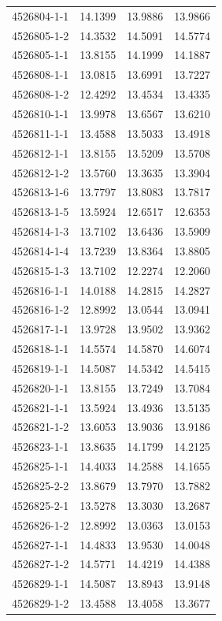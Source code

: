 \begin{longtable}{lrrr}
4526804-1-1 & 14.1399 & 13.9886 & 13.9866 \\
4526805-1-2 & 14.3532 & 14.5091 & 14.5774 \\
4526805-1-1 & 13.8155 & 14.1999 & 14.1887 \\
4526808-1-1 & 13.0815 & 13.6991 & 13.7227 \\
4526808-1-2 & 12.4292 & 13.4534 & 13.4335 \\
4526810-1-1 & 13.9978 & 13.6567 & 13.6210 \\
4526811-1-1 & 13.4588 & 13.5033 & 13.4918 \\
4526812-1-1 & 13.8155 & 13.5209 & 13.5708 \\
4526812-1-2 & 13.5760 & 13.3635 & 13.3904 \\
4526813-1-6 & 13.7797 & 13.8083 & 13.7817 \\
4526813-1-5 & 13.5924 & 12.6517 & 12.6353 \\
4526814-1-3 & 13.7102 & 13.6436 & 13.5909 \\
4526814-1-4 & 13.7239 & 13.8364 & 13.8805 \\
4526815-1-3 & 13.7102 & 12.2274 & 12.2060 \\
4526816-1-1 & 14.0188 & 14.2815 & 14.2827 \\
4526816-1-2 & 12.8992 & 13.0544 & 13.0941 \\
4526817-1-1 & 13.9728 & 13.9502 & 13.9362 \\
4526818-1-1 & 14.5574 & 14.5870 & 14.6074 \\
4526819-1-1 & 14.5087 & 14.5342 & 14.5415 \\
4526820-1-1 & 13.8155 & 13.7249 & 13.7084 \\
4526821-1-1 & 13.5924 & 13.4936 & 13.5135 \\
4526821-1-2 & 13.6053 & 13.9036 & 13.9186 \\
4526823-1-1 & 13.8635 & 14.1799 & 14.2125 \\
4526825-1-1 & 14.4033 & 14.2588 & 14.1655 \\
4526825-2-2 & 13.8679 & 13.7970 & 13.7882 \\
4526825-2-1 & 13.5278 & 13.3030 & 13.2687 \\
4526826-1-2 & 12.8992 & 13.0363 & 13.0153 \\
4526827-1-1 & 14.4833 & 13.9530 & 14.0048 \\
4526827-1-2 & 14.5771 & 14.4219 & 14.4388 \\
4526829-1-1 & 14.5087 & 13.8943 & 13.9148 \\
4526829-1-2 & 13.4588 & 13.4058 & 13.3677 \\

\end{longtable}
